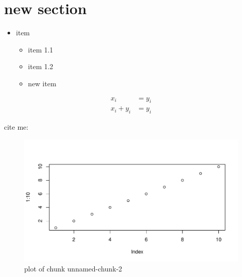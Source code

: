 \section{new section}\label{new-section}

\begin{itemize}
\itemsep1pt\parskip0pt
\item
  item

  \begin{itemize}
  \itemsep1pt\parskip0pt
  \item
    item 1.1
  \item
    item 1.2
  \item
    new item
  \end{itemize}
\end{itemize}

\[
\begin{aligned}
x_i &= y_i \\
x_i + y_i &= y_i
\end{aligned}
\]

cite me: \textcite{Abb97}

\begin{Shaded}
\begin{Highlighting}[]
\StringTok{ }
\NormalTok{(}\NormalTok{:}\NormalTok{)}
\end{Highlighting}
\end{Shaded}

\begin{figure}[htbp]
\centering
\includegraphics{figs/test/unnamed-chunk-2-1.pdf}
\caption{plot of chunk unnamed-chunk-2}
\end{figure}
